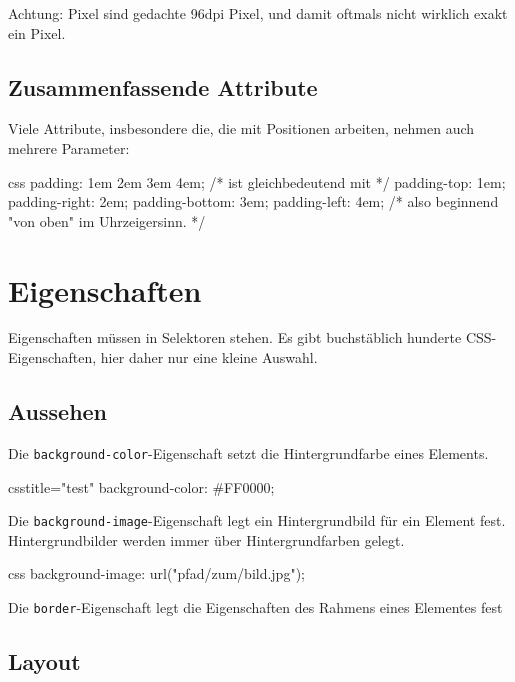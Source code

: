 \documentclass[10pt,a4paper]{article}
\begin{document}
\begin{multicols}{3}
Achtung: Pixel sind gedachte 96dpi Pixel, und damit oftmals nicht wirklich exakt ein Pixel.

\subsection*{Zusammenfassende Attribute}
Viele Attribute, insbesondere die, die mit Positionen arbeiten, nehmen auch mehrere Parameter:

\begin{codebox}{css}{}
padding: 1em 2em 3em 4em;
/* ist gleichbedeutend mit */
padding-top: 1em;
padding-right: 2em;
padding-bottom: 3em;
padding-left: 4em;
/* also beginnend "von oben" im Uhrzeigersinn. */
\end{codebox}


\section*{Eigenschaften}
Eigenschaften müssen in Selektoren stehen. Es gibt buchstäblich hunderte CSS-Eigenschaften\cite{w3c-css}, hier daher nur eine kleine Auswahl.

\subsection*{Aussehen}
Die \texttt{background-color}-Eigenschaft setzt die Hintergrundfarbe eines Elements.
\begin{codebox}{css}{title="test"}
background-color: #FF0000;
\end{codebox}

Die \texttt{background-image}-Eigenschaft legt ein Hintergrundbild für ein Element fest. Hintergrundbilder werden immer über Hintergrundfarben gelegt.
\begin{codebox}{css}{}
background-image: url("pfad/zum/bild.jpg");
\end{codebox}

Die \texttt{border}-Eigenschaft legt die Eigenschaften des Rahmens eines Elementes fest



\subsection*{Layout}



\end{multicols}
\end{document}
